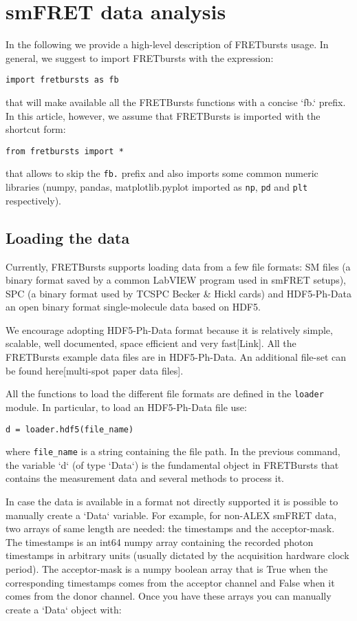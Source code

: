 \section{smFRET data analysis}

In the following we provide a high-level description of FRETbursts usage. In general, we suggest to import FRETbursts with the expression:

\verb|import fretbursts as fb|

that will make available all the FRETBursts functions with a concise `fb.` prefix. In this article, however, we assume that FRETBursts is imported with the shortcut form:

\verb|from fretbursts import *|

that allows to skip the \verb|fb.| prefix and also imports some common numeric libraries (numpy, pandas, matplotlib.pyplot imported as \verb|np|, \verb|pd| and \verb|plt| respectively).

\subsection{Loading the data}
Currently, FRETBursts supports loading data from a few file formats: SM files (a binary format saved by a common LabVIEW program used in smFRET setups), SPC (a binary format used by TCSPC Becker & Hickl cards) and HDF5-Ph-Data an open binary format single-molecule data based on HDF5.

We encourage adopting HDF5-Ph-Data format because it is relatively simple, scalable, well documented, space efficient and very fast[Link]. All the FRETBursts example data files are in HDF5-Ph-Data. An additional file-set can be found here[multi-spot paper data files].

All the functions to load the different file formats are defined in the \verb|loader| module. In particular, to load an HDF5-Ph-Data file use:

\verb|d = loader.hdf5(file_name)|

where \verb|file_name| is a string containing the file path. In the previous command, the variable `d` (of type `Data`) is the fundamental object in FRETBursts that contains the measurement data and several methods to process it.

In case the data is available in a format not directly supported it is possible to manually create a `Data` variable. For example, for non-ALEX smFRET data, two arrays of same length are needed: the timestamps and the acceptor-mask. The timestamps is an int64 numpy array containing the recorded photon timestamps in arbitrary units (usually dictated by the acquisition hardware clock period). The acceptor-mask is a numpy boolean array that is True when the corresponding timestamps comes from the acceptor channel and False when it comes from the donor channel. Once you have these arrays you can manually create a `Data` object with:

